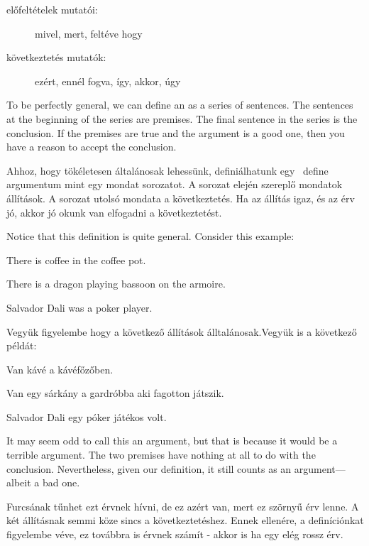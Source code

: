 \begin{description}
\item[előfeltételek mutatói:] mivel, mert, feltéve hogy
\item[következtetés mutatók:] ezért, ennél fogva, így, akkor, úgy
\end{description}


To be perfectly general, we can define an  as a series of sentences. The sentences at the beginning of the series are premises. The final sentence in the series is the conclusion. If the premises are true and the argument is a good one, then you have a reason to accept the conclusion.


Ahhoz, hogy tökéletesen általánosak lehessünk, definiálhatunk egy \ define {argumentum} mint egy mondat sorozatot. A sorozat elején szereplő mondatok állítások. A sorozat utolsó mondata a következtetés. Ha az állítás igaz, és az érv jó, akkor jó okunk van elfogadni a következtetést.


Notice that this definition is quite general. Consider this example:
\begin{earg}
\item[] There is coffee in the coffee pot.
\item[] There is a dragon playing bassoon on the armoire.
\item[\therefore] Salvador Dali was a poker player.
\end{earg}


Vegyük figyelembe hogy a következő állítások álltalánosak.Vegyük is a következő példát:
\begin{earg}
\item[] Van kávé a kávéfőzőben.
\item[] Van egy sárkány a gardróbba aki fagotton játszik.
\item[\therefore] Salvador Dali egy póker játékos volt.
\end{earg}


It may seem odd to call this an argument, but that is because it would be a {terrible} argument. The two premises have nothing at all to do with the conclusion. Nevertheless, given our definition, it still counts as an argument--- albeit a bad one.


Furcsának tűnhet ezt  érvnek hívni, de ez azért van, mert ez {szörnyű} érv lenne. A két állításnak semmi köze sincs a következtetéshez. Ennek ellenére, a definíciónkat figyelembe véve, ez továbbra is érvnek számít - akkor is ha egy elég rossz érv.


